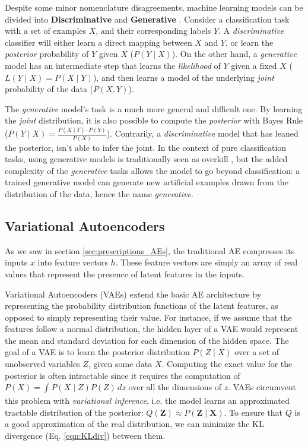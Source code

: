 \documentclass[runningheads]{llncs}
\begin{document}
Despite some minor nomenclature disagreements, machine learning models can be divided into \textbf{Discriminative} and \textbf{Generative} \cite{ng2002discriminative,kingma2019introduction}. 
Consider a classification task with a set of examples $X$, and their corresponding labels $Y$.
A \textit{discriminative} classifier will either learn a direct mapping between $X$ and $Y$, or learn the \textit{posterior} probability of $Y$ given $X$ ($P(Y \mid X)$).
On the other hand, a \textit{generative} model has an intermediate step that learns the \textit{likelihood} of $Y$ given a fixed $X$ ($L(Y \mid X) = P(X \mid Y)$), and then learns a model of the underlying \textit{joint} probability of the data ($P(X ,Y)$).

The \textit{generative} model's task is a  much more general and difficult one. By learning the \textit{joint} distribution, it is also possible to compute the \textit{posterior} with Bayes Rule ($P(Y \mid X)=\frac{P(X \mid Y) \cdot P(Y)}{P(X)}$). Contrarily, a \textit{discriminative} model that has leaned the posterior, isn't able to infer the joint.
In the context of pure classification tasks, using generative models is traditionally seen as overkill \cite{vapnik2013nature}, but the added complexity of the \textit{generative} tasks allows the model to go beyond classification: a trained generative model can generate new artificial examples drawn from the distribution of the data, hence the name \textit{generative}.

\subsection{Variational Autoencoders}
\label{sec:gen_VAE}
As we saw in section \ref{sec:prescriptions_AEs}, the traditional AE compresses its inputs $x$ into  feature vectors $h$. These feature vectors are simply an array of real values that represent the presence of latent features in the inputs.

Variational Autoencoders (VAEs) extend the basic AE architecture by representing the probability distribution functions of the latent features, as opposed to simply representing their value. For instance, if we assume that the features follow a normal distribution, the hidden layer of a VAE would represent the mean and standard deviation for each dimension of the hidden space. The goal of a VAE is to learn the posterior distribution \(P(Z \mid X)\) over a set of unobserved variables $Z$, given some data $X$. Computing the exact value for the posterior is often intractable since it requires the computation of \(P(X)=\int_{}^{} P(X \mid Z)P(Z) \,dz\) over all the dimensions of $z$. VAEs circumvent this problem with \textit{variational inference}, i.e. the model learns an approximated tractable distribution of the posterior: \( Q(\mathbf{Z}) \approx P(\mathbf{Z} \mid \mathbf{X})\). To ensure that $Q$ is a good approximation of the real distribution, we can minimize the KL divergence (Eq. \ref{eqn:KLdiv}) between them.
\end{document}
